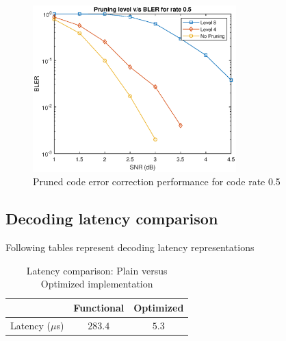 \begin{figure}[]
	\centering
	\includegraphics[width=0.7\textwidth]{./figures/matlabPlots/rate5Curves.eps}
	\caption{Pruned code error correction performance for code rate 0.5}
	\label{fig:pruningLevelVsRate5}
\end{figure}
%

\subsection{Decoding latency comparison}
Following tables represent decoding latency representations
\begin{table}[!h]
	\begin{center}
		\caption{Latency comparison: Plain versus Optimized implementation}
		\label{tab:decoderLatency}
		\begin{tabular}{c|c|c} %
			\textbf{ } & Functional & Optimized \\
			\hline
			Latency ($\mu$s) & $283.4$ & $5.3$\\
		\end{tabular}
	\end{center}
\end{table}

